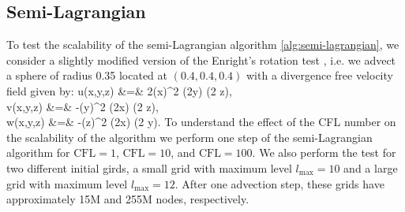 \subsection{Semi-Lagrangian}
To test the scalability of the semi-Lagrangian algorithm \ref{alg:semi-lagrangian}, we consider a slightly modified version of the Enright's rotation test \cite{Enright;Fedkiw;Ferziger;etal:02:A-Hybrid-Particle-Le}, i.e. we advect a sphere of radius 0.35 located at $(0.4, 0.4, 0.4)$ with a divergence free velocity field given by:
\bean
u(x,y,z) &=& 2\sin(\pi x)^2 \sin(2\pi y) \sin(2 \pi z), \\
v(x,y,z) &=& -\sin(\pi y)^2 \sin(2\pi x) \sin(2 \pi z),\\
w(x,y,z) &=& -\sin(\pi z)^2 \sin(2\pi x) \sin(2 \pi y). 
\eean
To understand the effect of the CFL number on the scalability of the algorithm we perform one step of the semi-Lagrangian algorithm for $\text{CFL} = 1$, $\text{CFL} = 10$, and $\text{CFL} = 100$. We also perform the test for two different initial girds, a small grid with maximum level $l_\text{max} = 10$ and a large grid with maximum level $l_\text{max} = 12$. After one advection step, these grids have approximately 15M and 255M nodes, respectively. 
